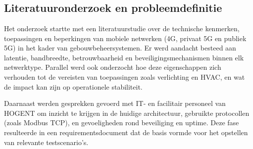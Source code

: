 
\chapter{}%
\label{ch:methodologie}


\section{Literatuuronderzoek en probleemdefinitie}

Het onderzoek startte met een literatuurstudie over de technische kenmerken, toepassingen en beperkingen van mobiele netwerken (4G, privaat 5G en publiek 5G) in het kader van gebouwbeheersystemen. Er werd aandacht besteed aan latentie, bandbreedte, betrouwbaarheid en beveiligingsmechanismen binnen elk netwerktype. Parallel werd ook onderzocht hoe deze eigenschappen zich verhouden tot de vereisten van toepassingen zoals verlichting en HVAC, en wat de impact kan zijn op operationele stabiliteit.

Daarnaast werden gesprekken gevoerd met IT- en facilitair personeel van HOGENT om inzicht te krijgen in de huidige architectuur, gebruikte protocollen (zoals Modbus TCP), en gevoeligheden rond beveiliging en uptime. Deze fase resulteerde in een requirementsdocument dat de basis vormde voor het opstellen van relevante testscenario’s.

